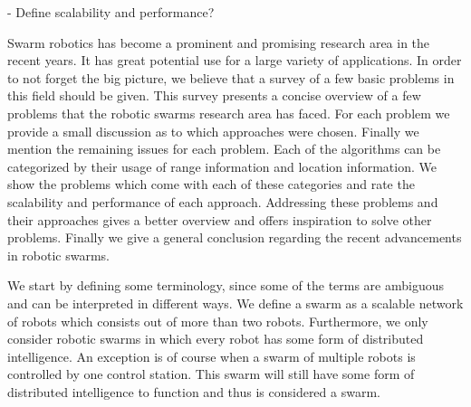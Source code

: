 
- Define scalability and performance?





Swarm robotics has become a prominent and promising research area in the recent years. 
It has great potential use for a large variety of applications. 
In order to not forget the big picture, we believe that a survey of a few basic problems in this field should be given. 
This survey presents a concise overview of a few problems that the robotic swarms research area has faced. For each problem we provide a small discussion as to which approaches were chosen. 
Finally we mention the remaining issues for each problem. 
Each of the algorithms can be categorized by their usage of range information and location information. 
We show the problems which come with each of these categories and rate the scalability and performance of each approach. 
Addressing these problems and their approaches gives a better overview and offers inspiration to solve other problems.
Finally we give a general conclusion regarding the recent advancements in robotic swarms.  


We start by defining some terminology, since some of the terms are ambiguous and can be interpreted in different ways.
We define a swarm as a scalable network of robots which consists out of more than two robots.
Furthermore, we only consider robotic swarms in which every robot has some form of distributed intelligence.
An exception is of course when a swarm of multiple robots is controlled by one control station.
This swarm will still have some form of distributed intelligence to function and thus is considered a swarm.  \\

